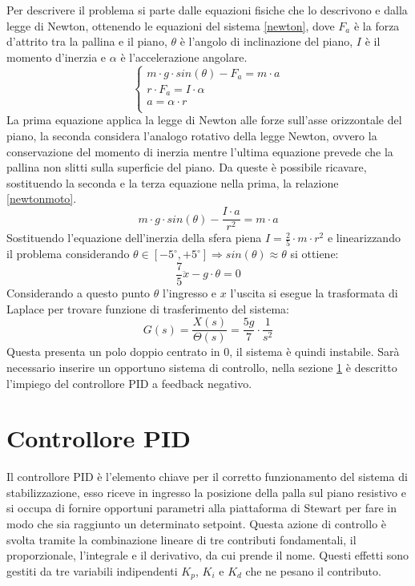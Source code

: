 \documentclass[12pt,twoside,openright]{report}
\begin{document}
Per descrivere il problema si parte dalle equazioni fisiche che lo descrivono e dalla legge di Newton, ottenendo le equazioni del sistema \ref{newton}, dove $F_a$ è la forza d'attrito tra la pallina e il piano, $\theta$ è l'angolo di inclinazione del piano, $I$ è il momento d'inerzia e $\alpha$ è l'accelerazione angolare.
\begin{equation}\label{newton}
    \begin{cases}
      m\cdot g\cdot sin(\theta)-F_a=m\cdot a\\
      r\cdot F_a=I\cdot \alpha\\
      a=\alpha\cdot r\\
    \end{cases}
\end{equation}
La prima equazione applica la legge di Newton alle forze sull'asse orizzontale del piano, la seconda considera l'analogo rotativo della legge Newton, ovvero la conservazione del momento di inerzia mentre l'ultima equazione prevede che la pallina non slitti sulla superficie del piano. Da queste è possibile ricavare, sostituendo la seconda e la terza equazione nella prima, la relazione \ref{newtonmoto}.
\begin{equation}\label{newtonmoto}
    m\cdot g \cdot sin(\theta)-\frac{I\cdot a}{r^2}=m\cdot a
\end{equation}
Sostituendo l'equazione dell'inerzia della sfera piena $I=\frac{2}{5}\cdot m \cdot r^2$ e linearizzando il problema considerando $\theta \in [-5^\circ,+5^\circ]\Rightarrow sin(\theta)\approx \theta$ si ottiene:
\begin{equation}\label{beflap}
    \frac{7}{5} \ddot{x} -g\cdot \theta=0
\end{equation}
Considerando a questo punto $\theta$ l'ingresso e $x$ l'uscita si esegue la trasformata di Laplace per trovare funzione di trasferimento del sistema:
\begin{equation}\label{lap}
    G(s)=\frac{X(s)}{\Theta(s)}=\frac{5g}{7}\cdot \frac{1}{s^2}
\end{equation}
Questa presenta un polo doppio centrato in $0$, il sistema è quindi instabile.
Sarà necessario inserire un opportuno sistema di controllo, nella sezione \ref{pid} è descritto l'impiego del controllore PID a feedback negativo.
\section{Controllore PID}\label{pid}
Il controllore PID è l'elemento chiave per il corretto funzionamento del sistema di stabilizzazione, esso riceve in ingresso la posizione della palla sul piano resistivo e si occupa di fornire opportuni parametri alla piattaforma di Stewart per fare in modo che sia raggiunto un determinato setpoint.
Questa azione di controllo è svolta tramite la combinazione lineare di tre contributi fondamentali, il proporzionale, l'integrale e il derivativo, da cui prende il nome. Questi effetti sono gestiti da tre variabili indipendenti $K_p$, $K_i$ e $K_d$ che ne pesano il contributo. 
\end{document}
